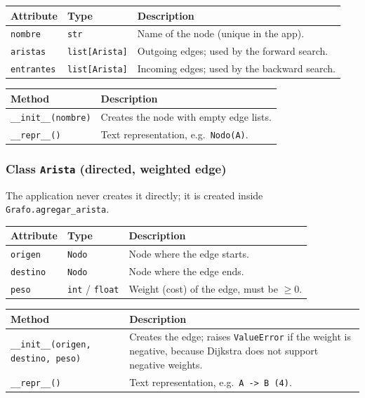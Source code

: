 \documentclass[11pt,letterpaper]{article}
\newcommand{\code}[1]{\texttt{#1}}
\begin{document}
\begin{tabularx}{\textwidth}{llL}
\toprule
\textbf{Attribute} & \textbf{Type} & \textbf{Description} \\
\midrule
\code{nombre}    & \code{str}           & Name of the node (unique in the app). \\
\code{aristas}   & \code{list[Arista]}  & Outgoing edges; used by the forward search. \\
\code{entrantes} & \code{list[Arista]}  & Incoming edges; used by the backward search. \\
\bottomrule
\end{tabularx}

\begin{tabularx}{\textwidth}{lL}
\toprule
\textbf{Method} & \textbf{Description} \\
\midrule
\code{\_\_init\_\_(nombre)} & Creates the node with empty edge lists. \\
\code{\_\_repr\_\_()}       & Text representation, e.g.\ \code{Nodo(A)}. \\
\bottomrule
\end{tabularx}

\subsubsection*{Class \code{Arista} (directed, weighted edge)}

The application never creates it directly; it is created inside
\code{Grafo.agregar\_arista}.

\begin{tabularx}{\textwidth}{llL}
\toprule
\textbf{Attribute} & \textbf{Type} & \textbf{Description} \\
\midrule
\code{origen}  & \code{Nodo}               & Node where the edge starts. \\
\code{destino} & \code{Nodo}               & Node where the edge ends. \\
\code{peso}    & \code{int} / \code{float} & Weight (cost) of the edge, must be $\ge 0$. \\
\bottomrule
\end{tabularx}

\begin{tabularx}{\textwidth}{lL}
\toprule
\textbf{Method} & \textbf{Description} \\
\midrule
\code{\_\_init\_\_(origen, destino, peso)} & Creates the edge; raises \code{ValueError} if the weight is negative, because Dijkstra does not support negative weights. \\
\code{\_\_repr\_\_()} & Text representation, e.g.\ \code{A -> B (4)}. \\
\bottomrule
\end{tabularx}
\end{document}
